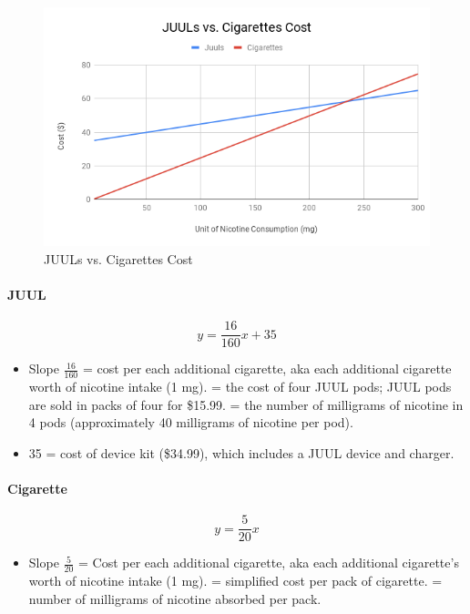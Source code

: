 \documentclass[12pt,letterpaper]{article}
\begin{document}
\begin{figure}[H]
  \centering
  \includegraphics[width=.7\linewidth]{JUULs-vs-Cigarettes-Cost}
  \caption{JUULs vs. Cigarettes Cost}
  \label{fig:cigcosts}
\end{figure}

\paragraph{JUUL}
\begin{equation}
\label{eq:juul}
y = \frac{16}{160} x + 35
\end{equation}
  \begin{itemize}
  	\item Slope $\frac{16}{160}$ = cost per each additional cigarette, aka each additional cigarette worth of nicotine intake (1 mg).
  	   = the cost of four JUUL pods; JUUL pods are sold in packs of four for \$15.99.
  	   = the number of milligrams of nicotine in 4 pods (approximately 40 milligrams of nicotine per pod).
  	\item 35 = cost of device kit (\$34.99), which includes a JUUL device and charger.
  \end{itemize}
\paragraph{Cigarette}
\begin{equation}
\label{eq:cig}
y = \frac{5}{20} x
\end{equation}
  \begin{itemize}
    \item Slope $\frac{5}{20}$ = Cost per each additional cigarette, aka each additional cigarette’s worth of nicotine intake (1 mg).
       = simplified cost per pack of cigarette.
       = number of milligrams of nicotine absorbed per pack.
  \end{itemize}
\end{document}
